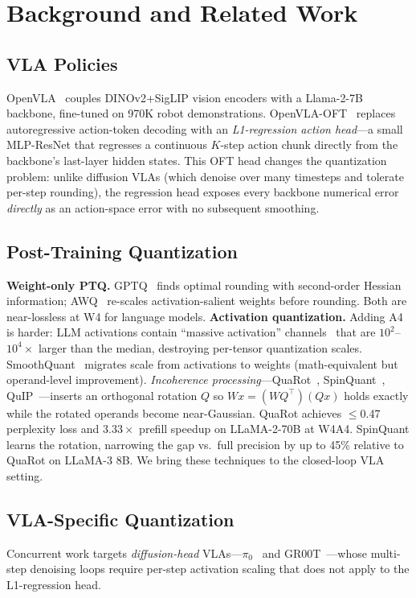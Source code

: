 \documentclass[conference]{IEEEtran}
\begin{document}
\section{Background and Related Work}
\label{sec:related}

\subsection{VLA Policies}
OpenVLA~\cite{openvla} couples DINOv2+SigLIP vision encoders with a Llama-2-7B backbone,
fine-tuned on 970K robot demonstrations. OpenVLA-OFT~\cite{openvlaoft} replaces autoregressive
action-token decoding with an \emph{L1-regression action head}---a small MLP-ResNet that
regresses a continuous $K$-step action chunk directly from the backbone's last-layer hidden
states. This OFT head changes the quantization problem: unlike diffusion VLAs (which denoise
over many timesteps and tolerate per-step rounding), the regression head exposes every
backbone numerical error \emph{directly} as an action-space error with no subsequent smoothing.

\subsection{Post-Training Quantization}
\textbf{Weight-only PTQ.} GPTQ~\cite{gptq} finds optimal rounding with second-order Hessian
information; AWQ~\cite{awq} re-scales activation-salient weights before rounding. Both are
near-lossless at W4 for language models. \textbf{Activation quantization.} Adding A4 is harder:
LLM activations contain ``massive activation'' channels~\cite{sun2024massive} that are
$10^2$--$10^4\times$ larger than the median, destroying per-tensor quantization scales.
SmoothQuant~\cite{smoothquant} migrates scale from activations to weights (math-equivalent but
operand-level improvement). \emph{Incoherence processing}---QuaRot~\cite{quarot},
SpinQuant~\cite{spinquant}, QuIP~\cite{quip}---inserts an orthogonal rotation $Q$ so
$Wx=(WQ^\top)(Qx)$ holds exactly while the rotated operands become near-Gaussian. QuaRot
achieves $\leq$0.47 perplexity loss and $3.33\times$ prefill speedup on LLaMA-2-70B at W4A4.
SpinQuant learns the rotation, narrowing the gap vs.\ full precision by up to 45\% relative
to QuaRot on LLaMA-3 8B. We bring these techniques to the closed-loop VLA setting.

\subsection{VLA-Specific Quantization}
Concurrent work targets \emph{diffusion-head} VLAs---$\pi_0$~\cite{pi0} and
GR00T~\cite{groot}---whose multi-step denoising loops require per-step activation scaling
that does not apply to the L1-regression head.
\end{document}
